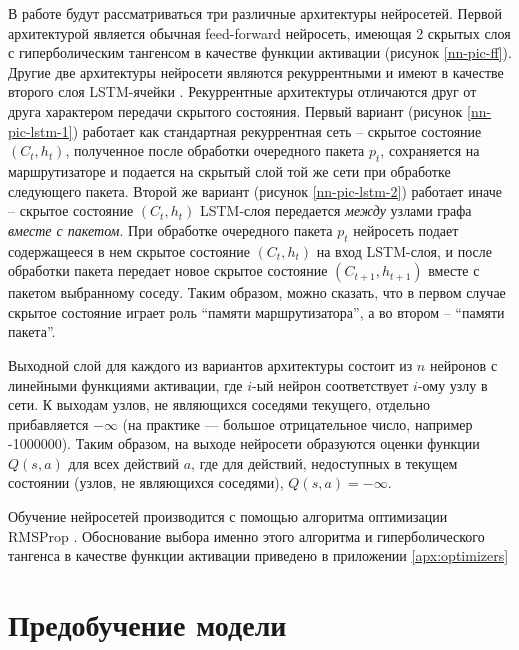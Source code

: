 \documentclass[specification, annotation]{itmo-student-thesis}
\begin{document}
В работе будут рассматриваться три различные архитектуры нейросетей. Первой
архитектурой является обычная feed-forward нейросеть, имеющая 2 скрытых слоя с
гиперболическим тангенсом в качестве функции активации (рисунок
\ref{nn-pic-ff}). Другие две архитектуры нейросети
являются рекуррентными и имеют в качестве второго слоя
LSTM-ячейки \cite{hochreiter1997long}. Рекуррентные
архитектуры отличаются друг от друга характером передачи скрытого состояния.
Первый вариант (рисунок \ref{nn-pic-lstm-1}) работает как стандартная
рекуррентная сеть -- скрытое состояние $(C_t, h_t)$, полученное после обработки
очередного пакета $p_t$, сохраняется на маршрутизаторе и подается на скрытый
слой той же сети при обработке следующего пакета. Второй же вариант (рисунок
\ref{nn-pic-lstm-2}) работает иначе -- скрытое состояние $(C_t, h_t)$ LSTM-слоя
передается \textit{между} узлами графа \textit{вместе с пакетом}. При обработке
очередного пакета $p_t$ нейросеть подает содержащееся в нем скрытое состояние
$(C_t, h_t)$ на вход LSTM-слоя, и после обработки пакета передает новое скрытое
состояние $(C_{t+1}, h_{t+1})$ вместе с пакетом выбранному соседу. Таким
образом, можно сказать, что в первом случае скрытое состояние играет роль
\enquote{памяти маршрутизатора}, а во втором -- \enquote{памяти пакета}.

Выходной слой для каждого из вариантов архитектуры состоит из $n$
нейронов с линейными функциями активации, где $i$-ый нейрон
соответствует $i$-ому узлу в сети. К выходам узлов, не являющихся соседями
текущего, отдельно прибавляется $-\infty$ (на практике --- большое отрицательное
число, например -1000000). Таким образом, на выходе нейросети образуются оценки
функции $Q(s, a)$ для всех действий $a$, где для действий, недоступных в текущем
состоянии (узлов, не являющихся соседями), $Q(s, a) = -\infty$.

Обучение нейросетей производится с помощью алгоритма оптимизации
RMSProp \cite{tieleman2012lecture}. Обоснование выбора именно этого алгоритма и
гиперболического тангенса в качестве функции активации приведено в приложении
\ref{apx:optimizers}

\section{Предобучение модели}
\end{document}

